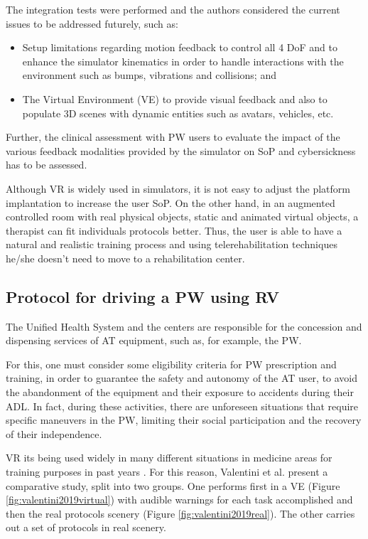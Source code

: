 The integration tests were performed and the authors considered the current issues to be addressed futurely, such as:
\begin{itemize} 
\item Setup limitations regarding motion feedback to control all 4 DoF and to enhance the simulator kinematics in order to handle interactions with the environment such as bumps, vibrations and collisions; and
\item The Virtual Environment (VE) to provide visual feedback and also to populate 3D scenes with dynamic entities such as avatars, vehicles, etc.
\end{itemize}

Further, the clinical assessment with PW users to evaluate the impact of the various feedback modalities provided by the simulator on SoP and cybersickness has to be assessed.

Although VR is widely used in simulators, it is not easy to adjust the platform implantation to increase the user SoP. On the other hand, in an augmented controlled room with real physical objects, static and animated virtual objects, a therapist can fit individuals protocols better. Thus, the user is able to have a natural and realistic training process and using telerehabilitation techniques he/she doesn't need to move to a rehabilitation center. 


\subsection{Protocol for driving a PW using RV}
\label{sec:valentiniPMRT2019}
The Unified Health System and the centers are responsible for the concession and dispensing services of AT equipment, such as, for example, the PW.

For this, one must consider some eligibility criteria for PW prescription and training, in order to guarantee the safety and autonomy of the AT user, to avoid the abandonment of the equipment and their exposure to accidents during their ADL. In fact, during these activities, there are unforeseen situations that require specific maneuvers in the PW, limiting their social participation and the recovery of their independence.

VR its being used widely in many different situations in medicine areas for training purposes in past years \cite{vailland2019,john2018, kamaraj2016, mahajan2013}. For this reason, Valentini et al. \cite{valentini2019} present a comparative study, split into two groups. One performs first in a VE (Figure \ref{fig:valentini2019virtual}) with audible warnings for each task accomplished and then the real protocols scenery (Figure \ref{fig:valentini2019real}). The other carries out a set of protocols in real scenery.

